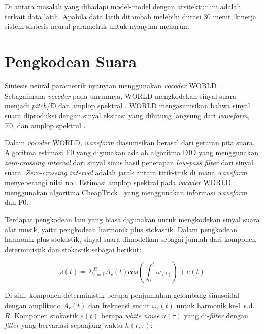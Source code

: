 Di antara masalah yang dihadapi model-model dengan arsitektur ini adalah terkait data latih. Apabila data latih ditambah melebihi durasi 30 menit, kinerja sistem sintesis neural parametrik untuk nyanyian menurun. \parencite{bonada2017singing}

\section{Pengkodean Suara} \label{voice coding}

Sintesis neural parametrik nyanyian \parencite{bonada2017singing} menggunakan \textit{vocoder} WORLD \parencite{morise2016world}. Sebagaimana \textit{vocoder} pada umumnya, WORLD mengkodekan sinyal suara menjadi \textit{pitch}/f0 dan amplop spektral \parencite{dudley1939vocoder}. WORLD mengasumsikan bahwa sinyal suara diproduksi dengan sinyal eksitasi yang dihitung langsung dari \textit{waveform}, F0, dan amplop spektral \parencite{morise2016world}.

Dalam \textit{vocoder} WORLD, \textit{waveform} diasumsikan berasal dari getaran pita suara. Algoritma estimasi F0 yang digunakan adalah algoritma DIO \parencite{morise2009fast} yang menggunakan \textit{zero-crossing interval} dari sinyal sinus hasil penerapan \textit{low-pass filter} dari sinyal suara. \textit{Zero-crossing interval} adalah jarak antara titik-titik di mana \textit{waveform} menyeberangi nilai nol. Estimasi amplop spektral pada \textit{vocoder} WORLD menggunakan algoritma CheapTrick \parencite{morise2015cheaptrick}, yang menggunakan informasi \textit{waveform} dan F0.

Terdapat pengkodean lain yang biasa digunakan untuk mengkodekan sinyal suara alat musik, yaitu pengkodean harmonik plus stokastik. Dalam pengkodean harmonik plus stokastik, sinyal suara dimodelkan sebagai jumlah dari komponen deterministik dan stokastik sebagai berikut:\parencite{serra1997sineplusnoise}

\begin{equation}
s(t)=\Sigma_{r=1}^{R} A_r(t) cos (\int_0^t\omega_(t))+e(t)
\end{equation}

Di sini, komponen deterministik berupa penjumlahan gelombang sinusoidal dengan amplitudo $A_r(t)$ dan frekuensi sudut $\omega_r(t)$ untuk harmonik ke-$1$ s.d. $R$. Komponen stokastik $e(t)$ berupa \textit{white noise} $u(\tau)$ yang di-\textit{filter} dengan \textit{filter} yang bervariasi sepanjang waktu $h(t,\tau)$: \parencite{serra1997sineplusnoise}

